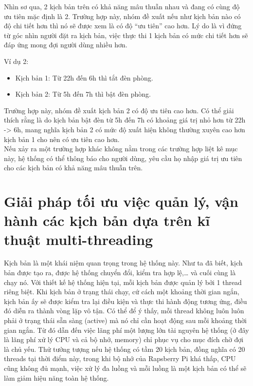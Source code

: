 \documentclass[12pt,a4paper,oneside]{extbook}
\begin{document}
\noindent
Nhìn sơ qua, 2 kịch bản trên có khả năng mâu thuẫn nhau và đang có cùng độ ưu tiên mặc định là 2. Trường hợp này, nhóm đề xuất nếu như kịch bản nào có độ chi tiết hơn thì nó sẽ được xem là có độ “ưu tiên” cao hơn. Lý do là vì đứng từ góc nhìn người đặt ra kịch bản, việc thực thi 1 kịch bản có mức chi tiết hơn sẽ đáp ứng mong đợi người dùng nhiều hơn.

\noindent
Ví dụ 2:

\begin{itemize}[topsep=1mm,itemsep=-0.5mm]
\item Kịch bản 1: Từ 22h đến 6h thì tắt đèn phòng.
\item Kịch bản 2: Từ 5h đến 7h thì bật đèn phòng.
\vspace{1mm}
\end{itemize}

\noindent
Trường hợp này, nhóm đề xuất kịch bản 2 có độ ưu tiên cao hơn. Có thể giải thích rằng là do kịch bản bật đèn từ 5h đến 7h có khoảng giá trị nhỏ hơn từ 22h -> 6h, mang nghĩa kịch bản 2 có mức độ xuất hiện không thường xuyên cao hơn kịch bản 1 cho nên có ưu tiên cao hơn.\\

\noindent
Nếu xảy ra một trường hợp khác không nằm trong các trường hợp liệt kê mục này, hệ thống có thể thông báo cho người dùng, yêu cầu họ nhập giá trị ưu tiên cho các kịch bản có khả năng mâu thuẫn trên.

\section{Giải pháp tối ưu việc quản lý, vận hành các kịch bản dựa trên kĩ thuật multi-threading}

Kịch bản là một khái niệm quan trọng trong hệ thống này. Như ta đã biết, kịch bản được tạo ra, được hệ thống chuyển đổi, kiểm tra hợp lệ,\dots\hspace{0mm} và cuối cùng là chạy nó. Với thiết kế hệ thống hiện tại, mỗi kịch bản được quản lý bởi 1 thread riêng biệt. Khi kịch bản ở trạng thái chạy, cứ cách một khoảng thời gian ngắn, kịch bản ấy sẽ được kiểm tra lại điều kiện và thực thi hành động tương ứng, điều đó diễn ra thành vòng lặp vô tận. Có thể để ý thấy, mỗi thread không luôn luôn phải ở trạng thái sẵn sàng (active) mà nó chỉ cần hoạt động sau mỗi khoảng thời gian ngắn. Từ đó dẫn đến việc lãng phí một lượng lớn tài nguyên hệ thống (ở đây là lãng phí xử lý CPU và cả bộ nhớ, memory) chỉ phục vụ cho mục đích chờ đợi là chủ yếu. Thử tưởng tượng nếu hệ thống có tầm 20 kịch bản, đồng nghĩa có 20 threads tại thời điểm này, trong khi bộ nhớ của Rapsberry Pi khá thấp, CPU cũng không đủ mạnh, việc xử lý đa luồng và mỗi luồng là một kịch bản có thể sẽ làm giảm hiệu năng toàn hệ thống.\\
\end{document}
